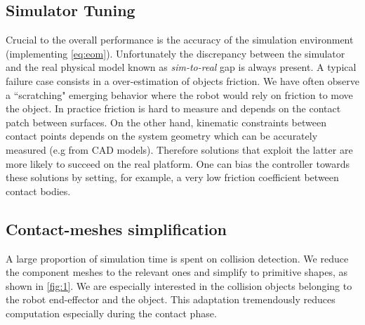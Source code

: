 \subsection{Simulator Tuning}
Crucial to the overall performance is the accuracy of the simulation environment (implementing \eqn \ref{eq:eom}). Unfortunately the discrepancy between the simulator and the real physical model known as \emph{sim-to-real} gap is always present. A typical failure case consists in a over-estimation of objects friction. We have often observe a ``scratching" emerging behavior where the robot would rely on friction to move the object. In practice friction is hard to measure and depends on the contact patch between surfaces. On the other hand, kinematic constraints between contact points depends on the system geometry which can be accurately measured (e.g from CAD models). Therefore solutions that exploit the latter are more likely to succeed on the real platform. One can bias the controller towards these solutions by setting, for example, a very low friction coefficient between contact bodies.

\subsection{Contact-meshes simplification}
A large proportion of simulation time is spent on collision detection. We reduce the component meshes to the relevant ones and simplify to primitive shapes, as shown in \fig\ref{fig:1}. We are especially interested in the collision objects belonging to the robot end-effector and the object. This adaptation tremendously reduces computation especially during the contact phase. 

